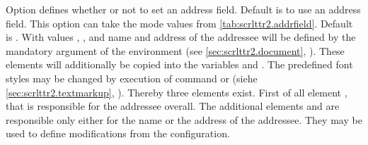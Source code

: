 %
%
%
%
%
%
%
%
%
Option  defines whether or not to set an address
field. Default is to use an address field. This option can take the mode
values from
\autoref{tab:scrlttr2.addrfield}. Default
is . With values , , and
 name and address of the addressee will be defined by
the mandatory argument of the  environment (see
\autoref{sec:scrlttr2.document},
). These elements will additionally be
copied into the variables  and .  The
predefined font styles may be changed by
execution of command  or  (siehe
\autoref{sec:scrlttr2.textmarkup},
). Thereby three elements
exist. First of all element
, that is
responsible for the addressee overall. The additional elements
 and
 are responsible
only either for the name or the address of the addressee. They may be used to
define modifications from the  configuration.%
%
%
%

